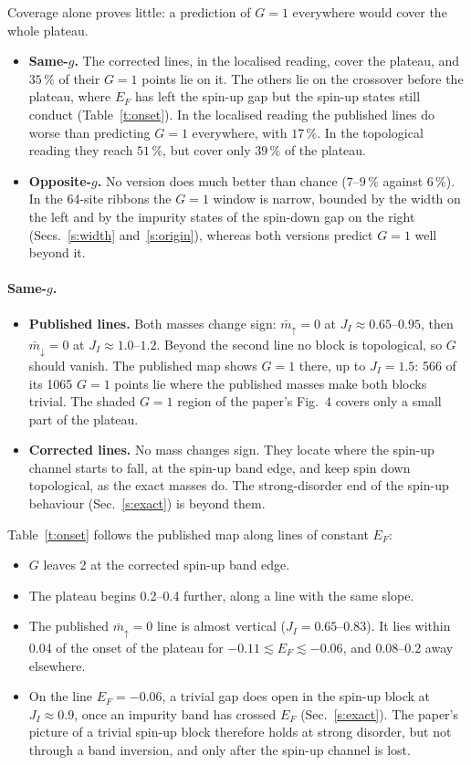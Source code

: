 \documentclass[11pt,a4paper]{article}
\newcommand{\up}{{\uparrow}}
\newcommand{\dn}{{\downarrow}}
\begin{document}
Coverage alone proves little: a prediction of $G=1$ everywhere would cover the whole plateau.
\begin{itemize}
\item \textbf{Same-$g$.} The corrected lines, in the localised reading, cover the plateau, and
  $35\,\%$ of their $G=1$ points lie on it. The others lie on the crossover before the plateau,
  where $E_F$ has left the spin-up gap but the spin-up states still conduct
  (Table~\ref{t:onset}). In the localised reading the published lines do worse than predicting
  $G=1$ everywhere, with $17\,\%$. In the topological reading they reach $51\,\%$, but cover only
  $39\,\%$ of the plateau.
\item \textbf{Opposite-$g$.} No version does much better than chance ($7$--$9\,\%$ against
  $6\,\%$). In the 64-site ribbons the $G=1$ window is narrow, bounded by the width on the left
  and by the impurity states of the spin-down gap on the right (Secs.~\ref{s:width}
  and~\ref{s:origin}), whereas both versions predict $G=1$ well beyond it.
\end{itemize}

\paragraph{Same-$g$.}
\begin{itemize}
\item \textbf{Published lines.} Both masses change sign: $\bar m_\up=0$ at $J_I\approx0.65$--$0.95$,
  then $\bar m_\dn=0$ at $J_I\approx1.0$--$1.2$. Beyond the second line no block is topological,
  so $G$ should vanish. The published map shows $G=1$ there, up to $J_I=1.5$: 566 of its 1065
  $G=1$ points lie where the published masses make both blocks trivial. The shaded $G=1$ region
  of the paper's Fig.~4 covers only a small part of the plateau.
\item \textbf{Corrected lines.} No mass changes sign. They locate where the spin-up channel
  starts to fall, at the spin-up band edge, and keep spin down topological, as the exact masses
  do. The strong-disorder end of the spin-up behaviour (Sec.~\ref{s:exact}) is beyond them.
\end{itemize}
Table~\ref{t:onset} follows the published map along lines of constant $E_F$:
\begin{itemize}
\item $G$ leaves 2 at the corrected spin-up band edge.
\item The plateau begins 0.2--0.4 further, along a line with the same slope.
\item The published $\bar m_\up=0$ line is almost vertical ($J_I=0.65$--$0.83$). It lies within
  0.04 of the onset of the plateau for $-0.11\lesssim E_F\lesssim-0.06$, and 0.08--0.2 away
  elsewhere.
\item On the line $E_F=-0.06$, a trivial gap does open in the spin-up block at $J_I\approx0.9$,
  once an impurity band has crossed $E_F$ (Sec.~\ref{s:exact}). The paper's picture of a trivial
  spin-up block therefore holds at strong disorder, but not through a band inversion, and only
  after the spin-up channel is lost.
\end{itemize}
\end{document}
